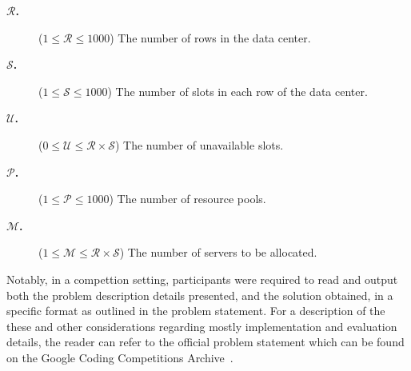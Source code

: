 \begin{description}
  \item[\textbf{$\mathcal{R}$.}] ($ 1 \leq \mathcal{R} \leq 1000$) The number of rows in the data center.
  \item[\textbf{$\mathcal{S}$.}] ($ 1 \leq \mathcal{S} \leq 1000$) The number of slots in each row of the data center.
  \item[\textbf{$\mathcal{U}$.}] ($ 0 \leq \mathcal{U} \leq \mathcal{R} \times \mathcal{S}$) The number of unavailable slots.
  \item[\textbf{$\mathcal{P}$.}] ($ 1 \leq \mathcal{P} \leq 1000$) The number of resource pools.
  \item[\textbf{$\mathcal{M}$.}] ($ 1 \leq \mathcal{M} \leq \mathcal{R} \times \mathcal{S}$) The number of servers to be allocated.
\end{description}

Notably, in a compettion setting, participants were required to read and output
both the problem description details presented, and the solution obtained, in a specific
format as outlined in the problem statement. For a description of the these and
other considerations regarding mostly implementation and evaluation details, the
reader can refer to the official problem statement which can be found on the
Google Coding Competitions Archive~\cite{googlellc2023codingcompetitionsarchive}.

